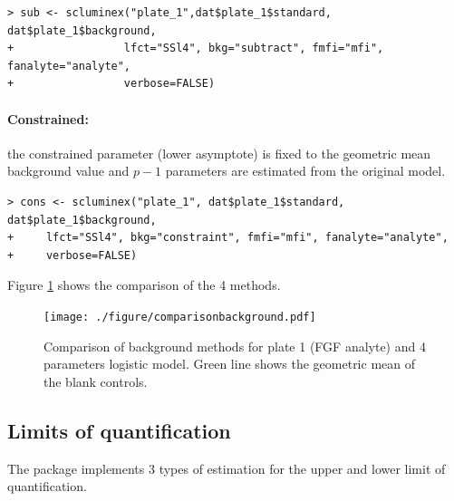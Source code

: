 \documentclass[11pt]{article}\usepackage[]{graphicx}\usepackage[]{color}
\makeatletter
\newenvironment{kframe}{%
 \def\at@end@of@kframe{}%
 \ifinner\ifhmode%
  \def\at@end@of@kframe{\end{minipage}}%
  \begin{minipage}{\columnwidth}%
 \fi\fi%
 \def\FrameCommand##1{\hskip\@totalleftmargin \hskip-\fboxsep
 \colorbox{shadecolor}{##1}\hskip-\fboxsep
     \hskip-\linewidth \hskip-\@totalleftmargin \hskip\columnwidth}%
 \MakeFramed {\advance\hsize-\width
   \@totalleftmargin\z@ \linewidth\hsize
   \@setminipage}}%
 {\par\unskip\endMakeFramed%
 \at@end@of@kframe}
\newenvironment{knitrout}{}{} %
\makeatother
\begin{document}
\begin{knitrout}
\color{fgcolor}\begin{kframe}
\begin{verbatim}
> sub <- scluminex("plate_1",dat$plate_1$standard, dat$plate_1$background, 
+                 lfct="SSl4", bkg="subtract", fmfi="mfi", fanalyte="analyte", 
+                 verbose=FALSE)
\end{verbatim}
\end{kframe}
\end{knitrout}


\paragraph{Constrained:} the constrained parameter 
(lower asymptote) is fixed to the geometric mean background value and 
$p-1$ parameters are estimated from the original model. 

\begin{knitrout}
\color{fgcolor}\begin{kframe}
\begin{verbatim}
> cons <- scluminex("plate_1", dat$plate_1$standard, dat$plate_1$background, 
+     lfct="SSl4", bkg="constraint", fmfi="mfi", fanalyte="analyte", 
+     verbose=FALSE)
\end{verbatim}
\end{kframe}
\end{knitrout}



\noindent Figure \ref{fig:backcomp} shows the comparison of the 4 methods.




\begin{figure}[!ht]
\begin{center}
\texttt{[image: ./figure/comparisonbackground.pdf]}
\caption{Comparison of background methods for plate 1 (FGF analyte) 
and 4 parameters logistic model. Green line shows the geometric mean of the
blank controls.}
\label{fig:backcomp}
\end{center}
\end{figure}


\clearpage
\newpage

\subsection{Limits of quantification}
The package implements 3 types of estimation for the upper and lower 
limit of quantification.
\end{document}
